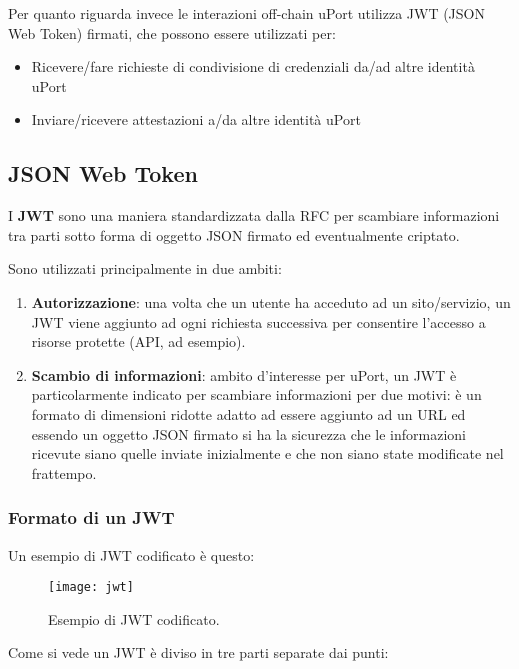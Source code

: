 Per quanto riguarda invece le interazioni off-chain uPort utilizza JWT (JSON Web Token)
firmati, che possono essere utilizzati per:
\begin{itemize}
  \item Ricevere/fare richieste di condivisione di credenziali da/ad altre identità uPort
  \item Inviare/ricevere attestazioni a/da altre identità uPort
\end{itemize}

\subsection{JSON Web Token}

I \textbf{JWT} sono una maniera standardizzata dalla RFC per scambiare informazioni
tra parti sotto forma di oggetto JSON firmato ed eventualmente criptato.

Sono utilizzati principalmente in due ambiti:
\begin{enumerate}
  \item \textbf{Autorizzazione}: una volta che un utente ha acceduto ad un sito/servizio,
  un JWT viene aggiunto ad ogni richiesta successiva per consentire
  l’accesso a risorse protette (API, ad esempio).
  \item \textbf{Scambio di informazioni}: ambito d’interesse per uPort,
  un JWT è particolarmente indicato per scambiare informazioni per due motivi:
  è un formato di dimensioni ridotte adatto ad essere aggiunto ad un URL
  ed essendo un oggetto JSON firmato si ha la sicurezza che le informazioni ricevute
  siano quelle inviate inizialmente e che non siano state modificate nel frattempo.
\end{enumerate}

\subsubsection{Formato di un JWT}

Un esempio di JWT codificato è questo:

\begin{figure}[!ht]
    \texttt{[image: jwt]}
    \caption{Esempio di JWT codificato.}
    \label{fig:jwt}
\end{figure}

Come si vede un JWT è diviso in tre parti separate dai punti:

